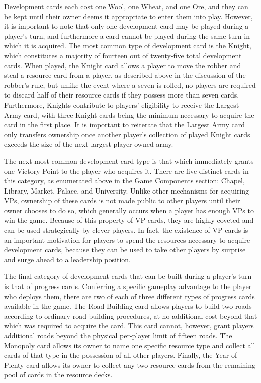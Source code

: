 \documentclass[pageno]{jpaper}
\begin{document}
\begin{doublespacing}
Development cards each cost one Wool, one Wheat, and one Ore, and they can be kept until their owner deems it appropriate to enter them into play. However, it is important to note that only one development card may be played during a player's turn, and furthermore a card cannot be played during the same turn in which it is acquired. The most common type of development card is the Knight, which constitutes a majority of fourteen out of twenty-five total development cards. When played, the Knight card allows a player to move the robber and steal a resource card from a player, as described above in the discussion of the robber's rule, but unlike the event where a seven is rolled, no players are required to discard half of their resource cards if they possess more than seven cards. Furthermore, Knights contribute to players' eligibility to receive the Largest Army card, with three Knight cards being the minimum necessary to acquire the card in the first place. It is important to reiterate that the Largest Army card only transfers ownership once another player's collection of played Knight cards exceeds the size of the next largest player-owned army.

The next most common development card type is that which immediately grants one Victory Point to the player who acquires it. There are five distinct cards in this category, as enumerated above in the \hyperlink{sec:game_components}{Game Components} section: Chapel, Library, Market, Palace, and University. Unlike other mechanisms for acquiring VPs, ownership of these cards is not made public to other players until their owner chooses to do so, which generally occurs when a player has enough VPs to win the game. Because of this property of VP cards, they are highly coveted and can be used strategically by clever players. In fact, the existence of VP cards is an important motivation for players to spend the resources necessary to acquire development cards, because they can be used to take other players by surprise and surge ahead to a leadership position.

The final category of development cards that can be built during a player's turn is that of progress cards. Conferring a specific gameplay advantage to the player who deploys them, there are two of each of three different types of progress cards available in the game. The Road Building card allows players to build two roads according to ordinary road-building procedures, at no additional cost beyond that which was required to acquire the card. This card cannot, however, grant players additional roads beyond the physical per-player limit of fifteen roads. The Monopoly card allows its owner to name one specific resource type and collect all cards of that type in the possession of all other players. Finally, the Year of Plenty card allows its owner to collect any two resource cards from the remaining pool of cards in the resource decks.


\end{doublespacing}
\end{document}

